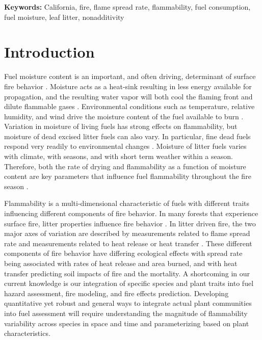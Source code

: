 \documentclass[letterpaper,12pt]{article}
\begin{document}
\noindent \textbf{Keywords:} California, fire, flame spread rate, flammability,
fuel consumption, fuel moisture, leaf litter, nonadditivity

\newpage

\section*{Introduction}

Fuel moisture content is an important, and often driving, determinant of
surface fire behavior \citep{Rothermel-1972}. Moisture acts as a heat-sink
resulting in less energy available for propagation, and the resulting water
vapor will both cool the flaming front and dilute flammable gases
\citep{Albini-1976, Shafizadeh-1977}. Environmental conditions such as
temperature, relative humidity, and wind drive the moisture content of the fuel
available to burn \citep{Kreye+Varner+etal-2018}. Variation in moisture of
living fuels has strong effects on flammability, but moisture of dead excised
litter fuels can also vary. In particular, fine dead fuels respond very readily
to environmental changes \citep{Nelson-2001}. Moisture of litter fuels varies
with climate, with seasons, and with short term weather within a season.
Therefore, both the rate of drying and flammability as a function of moisture
content are key parameters that influence fuel flammability throughout the fire
season \citep{Nelson-2001}.

Flammability is a multi-dimensional characteristic of fuels
\citep{Schwilk-2015, Pausas+Keeley+etal-2017} with different traits influencing
different components of fire behavior. In many forests that experience surface
fire, litter properties influence fire behavior
\citep{Ganteaume+Marielle+etal-2011, Schwilk+Caprio-2011,
  Varner+Kane+etal-2015}. In litter driven fire, the two major axes of
variation are described by measurements related to flame spread rate and
measurements related to heat release or heat transfer
\citep{Magalhaes+Schwilk-2012, Prior+Murphy+etal-2018}. These different
components of fire behavior have differing ecological effects with spread rate
being associated with rates of heat release and area burned, and with heat
transfer predicting soil impacts of fire and the mortality. A shortcoming in
our current knowledge is our integration of specific species and plant traits
into fuel hazard assessment, fire modeling, and fire effects prediction.
Developing quantitative yet robust and general ways to integrate actual plant
communities into fuel assessment will require understanding the magnitude of
flammability variability across species in space and time and parameterizing
based on plant characteristics.
\end{document}
